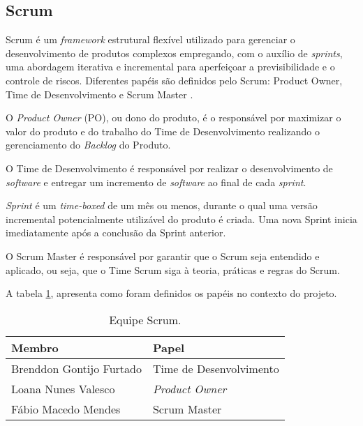     \subsection{Scrum}
    Scrum é um \textit{framework} estrutural flexível utilizado
    para gerenciar o desenvolvimento de produtos complexos empregando, com o auxílio de \textit{sprints}, uma abordagem iterativa
    e incremental para aperfeiçoar a previsibilidade e o controle de riscos. Diferentes papéis são definidos pelo Scrum: Product Owner, Time de Desenvolvimento e Scrum Master \cite{scrum_guide}.

    O \textit{Product Owner} (PO), ou dono do produto, é o responsável por maximizar o valor
    do produto e do trabalho do Time de Desenvolvimento realizando o gerenciamento
    do \textit{Backlog} do Produto.

    O Time de Desenvolvimento é responsável por realizar o desenvolvimento de \textit{software} e entregar um incremento de \textit{software} ao final de cada \textit{sprint}.

    \textit{Sprint} é um \textit{time-boxed} de um mês ou menos, durante o qual
    uma versão incremental potencialmente utilizável do produto é criada.
    Uma nova Sprint inicia imediatamente após a conclusão da Sprint anterior.

    O Scrum Master é responsável por garantir que o Scrum seja entendido e aplicado, ou seja, que o Time Scrum siga à teoria, práticas e regras do Scrum.

    A tabela \ref{equipe_scrum}, apresenta como foram definidos os papéis no contexto do projeto.

    \begin{table}[!htbp]
        \centering
        \begin{tabular}{|p{5cm}|p{4cm}|}
        \hline
        \textbf{Membro}                                                           & \textbf{Papel}        \\\hline
        Brenddon Gontijo Furtado                                                  & Time de Desenvolvimento \\\hline
        Loana Nunes Valesco                                                       & \textit{Product Owner}    \\\hline
        Fábio Macedo Mendes                                                       & Scrum Master    \\\hline
        \end{tabular}
        \caption{Equipe Scrum. }
        \label{equipe_scrum}
    \end{table}


